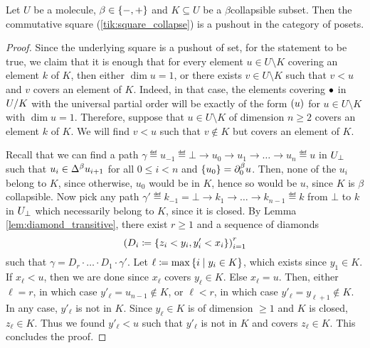 \begin{lem} \label{lem:collapsible_is_puhsout}
    Let \( U \) be a molecule, \( \beta \in \set{-, +} \) and \( K \subseteq U \) be a \( \beta \)\nbd collapsible subset.
    Then the commutative square (\ref{tik:square_collapse}) is a pushout in the category of posets.
\end{lem}
\begin{proof}
    Since the underlying square is a pushout of set, for the statement to be true, we claim that it is enough that for every element \( u \in U \setminus K \) covering an element \( k \) of \( K \), then either \( \dim u = 1 \), or there exists \( v \in U \setminus K \) such that \( v < u \) and \( v \) covers an element of \( K \).
    Indeed, in that case, the elements covering \( \zcoll \) in \( \coll{K}{U} \) with the universal partial order will be exactly of the form \( \icoll{u} \) for \( u \in U \setminus K \) with \( \dim u = 1 \). 
    Therefore, suppose that \( u \in U \setminus K \) of dimension \( n \geq 2 \) covers an element \( k \) of \( K \).
    We will find \( v < u \) such that \( v \notin K \) but covers an element of \( K \).

    Recall that we can find a path \( \gamma \eqdef u_{-1} \eqdef \bot \to u_0 \to u_1 \to \ldots \to u_n \eqdef u \) in \( \augm{U} \) such that \( u_i \in \faces{}{\beta} u_{i + 1} \) for all \( 0 \le i < n \) and \( \set{u_0} = \bd{0}{\beta} u \).
    Then, none of the \( u_i \) belong to \( K \), since otherwise, \( u_0 \) would be in \( K \), hence so would be \( u \), since \( K \) is \( \beta \)\nbd collapsible.
    Now pick any path \( \gamma' \eqdef k_{-1} = \bot \to k_1 \to \ldots \to k_{n - 1} \eqdef k \) from \( \bot \) to \( k \) in \( \augm{U} \) which necessarily belong to \( K \), since it is closed.
    By Lemma \ref{lem:diamond_transitive}, there exist \( r \geq 1 \) and a sequence of diamonds 
    \begin{equation*}
        \left(D_i \eqdef \set{z_i < y_i, y'_i < x_i}\right)_{i = 1}^r
    \end{equation*}
    such that \( \gamma = D_r \cdot \ldots \cdot D_1 \cdot \gamma' \).
    Let \( \ell \eqdef \max \set{i \mid y_i \in K} \), which exists since \( y_1 \in K \).
    If \( x_{\ell} < u \), then we are done since \( x_{\ell} \) covers \( y_{\ell} \in K \).
    Else \( x_{\ell} = u \).
    Then, either \( \ell = r \), in which case \( y'_{\ell} = u_{n - 1} \notin K \), or \( \ell < r \), in which case \( y'_{\ell} = y_{\ell + 1} \notin K \).
    In any case, \( y'_{\ell} \) is not in \( K \).
    Since \( y_{\ell} \in K \) is of dimension \( \geq 1 \) and \( K \) is closed, \( z_{\ell} \in K \).
    Thus we found \( y'_{\ell} < u \) such that \( y'_\ell \) is not in \( K \) and covers \( z_{\ell} \in K \).
    This concludes the proof.
\end{proof}


